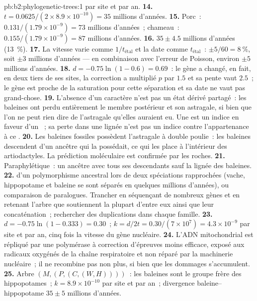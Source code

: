 \begin{solution}{pb:b2:phylogenetic-trees:1}
par site et par an.
\textbf{14.} $t = 0.0625/(2\times 8.9\times 10^{-10}) = 35$ millions
d'années.
\textbf{15.} Porc~: $0.131/(1.79\times 10^{-9}) = 73$ millions d'années~;
chameau~: $0.155/(1.79\times 10^{-9}) = 87$ millions d'années.
\textbf{16.} $35 \pm 4.5$ millions d'années (\qty{13}{\%}).
\textbf{17.} La vitesse varie comme $1/t_{\text{étal}}$ et la date comme
$t_{\text{étal}}$~: $\pm 5/60 = \qty{8}{\%}$, soit $\pm 3$ millions d'années
--- en combinaison avec l'erreur de Poisson, environ $\pm 5$ millions
d'années.
\textbf{18.} $d = -0.75\ln(1 - 0.6) = 0.69$~: le gène a changé, en fait,
en deux tiers de ses sites, la correction a multiplié
$p$ par $1.5$ et sa pente vaut $2.5$~; le gène est proche de la saturation
pour cette séparation et sa date ne vaut pas grand-chose.
\textbf{19.} L'absence d'un caractère n'est pas un état dérivé partagé~:
les baleines ont perdu entièrement le membre postérieur et son astragale,
si bien que l'on ne peut rien dire de l'astragale qu'elles auraient eu.
Une  est un indice en faveur d'un ~; sa perte dans une
lignée n'est pas un indice contre l'appartenance à ce .
\textbf{20.} Les baleines fossiles possèdent l'astragale à double poulie~:
les baleines descendent d'un ancêtre qui la possédait, ce qui les place à
l'intérieur des artiodactyles. La prédiction moléculaire est confirmée
par les roches.
\textbf{21.} Paraphylétique~: un ancêtre avec tous ses descendants sauf
la lignée des baleines.
\textbf{22.}  d'un polymorphisme ancestral
lors de deux spéciations rapprochées (vache, hippopotame et baleine se
sont séparés en quelques millions d'années), ou comparaison de
paralogues. Trancher en séquençant de nombreux gènes et en retenant
l'arbre que soutiennent la plupart d'entre eux ainsi que leur
concaténation~; rechercher des duplications dans chaque famille.
\textbf{23.} $d = -0.75\ln(1 - 0.333) = 0.30$~; $k = d/2t =
0.30/(7\times 10^{7}) = 4.3\times 10^{-9}$ par site et par an, cinq
fois la vitesse du gène nucléaire.
\textbf{24.} L'ADN mitochondrial est répliqué par une polymérase à
correction d'épreuves moins efficace, exposé aux radicaux oxygénés de la
chaîne respiratoire et non réparé par la machinerie nucléaire~; il ne
recombine pas non plus, si bien que les dommages s'accumulent.
\textbf{25.} Arbre $(M,(P,(C,(W,H))))$~: les baleines sont le groupe
frère des hippopotames~; $k = 8.9\times 10^{-10}$ par site et par an~;
divergence baleine--hippopotame $35 \pm 5$ millions d'années.
\end{solution}
